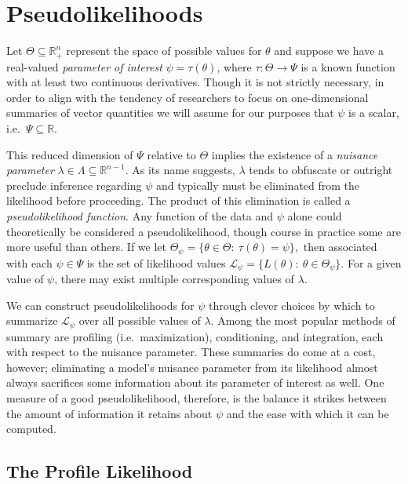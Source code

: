 \documentclass[
  12pt]{article}
\begin{document}
\section{Pseudolikelihoods}\label{pseudolikelihoods}

Let \(\Theta \subseteq \mathbb{R}^n_+\) represent the space of possible
values for \(\theta\) and suppose we have a real-valued \emph{parameter
of interest} \(\psi = \tau(\theta)\), where \(\tau: \Theta \to \Psi\) is
a known function with at least two continuous derivatives. Though it is
not strictly necessary, in order to align with the tendency of
researchers to focus on one-dimensional summaries of vector quantities
we will assume for our purposes that \(\psi\) is a scalar,
i.e.~\(\Psi \subseteq \mathbb{R}\).

This reduced dimension of \(\Psi\) relative to \(\Theta\) implies the
existence of a \emph{nuisance parameter}
\(\lambda \in \Lambda \subseteq \mathbb{R}^{n-1}\). As its name
suggests, \(\lambda\) tends to obfuscate or outright preclude inference
regarding \(\psi\) and typically must be eliminated from the likelihood
before proceeding. The product of this elimination is called a
\emph{pseudolikelihood function}. Any function of the data and \(\psi\)
alone could theoretically be considered a pseudolikelihood, though
course in practice some are more useful than others. If we let
\(\Theta_{\psi} = \{\theta \in \Theta: \> \tau(\theta) = \psi \},\) then
associated with each \(\psi \in \Psi\) is the set of likelihood values
\(\mathcal{L}_{\psi} = \{L(\theta): \> \theta \in \Theta_{\psi}\}.\) For
a given value of \(\psi\), there may exist multiple corresponding values
of \(\lambda\).

We can construct pseudolikelihoods for \(\psi\) through clever choices
by which to summarize \(\mathcal{L}_{\psi}\) over all possible values of
\(\lambda\). Among the most popular methods of summary are profiling
(i.e.~maximization), conditioning, and integration, each with respect to
the nuisance parameter. These summaries do come at a cost, however;
eliminating a model's nuisance parameter from its likelihood almost
always sacrifices some information about its parameter of interest as
well. One measure of a good pseudolikelihood, therefore, is the balance
it strikes between the amount of information it retains about \(\psi\)
and the ease with which it can be computed.

\subsection{The Profile Likelihood}\label{the-profile-likelihood}
\end{document}
